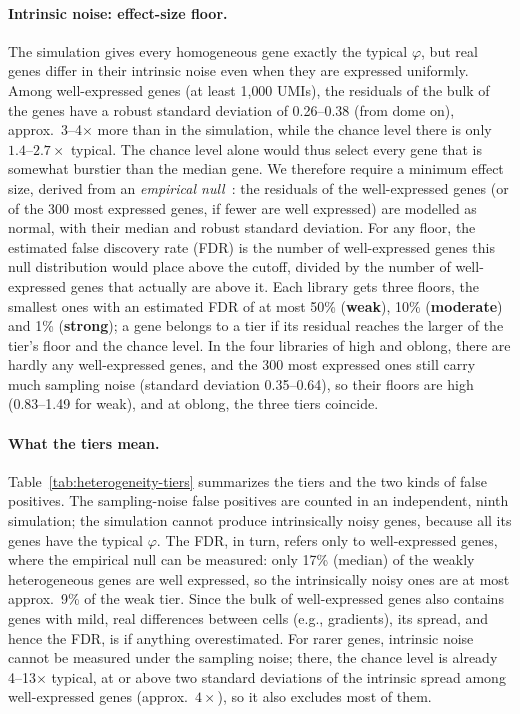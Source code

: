 \documentclass[11pt,a4paper]{article}
\begin{document}
\paragraph{Intrinsic noise: effect-size floor.} The simulation gives every homogeneous gene exactly the typical $\varphi$, but real genes differ in their intrinsic noise even when they are expressed uniformly. Among well-expressed genes (at least 1{,}000 UMIs), the residuals of the bulk of the genes have a robust standard deviation of 0.26--0.38 (from dome on), approx.~3--4$\times$ more than in the simulation, while the chance level there is only $1.4$--$2.7\times$ typical. The chance level alone would thus select every gene that is somewhat burstier than the median gene. We therefore require a minimum effect size, derived from an \emph{empirical null}~\cite{efron2004large}: the residuals of the well-expressed genes (or of the 300 most expressed genes, if fewer are well expressed) are modelled as normal, with their median and robust standard deviation. For any floor, the estimated false discovery rate (FDR) is the number of well-expressed genes this null distribution would place above the cutoff, divided by the number of well-expressed genes that actually are above it. Each library gets three floors, the smallest ones with an estimated FDR of at most 50\% (\textbf{weak}), 10\% (\textbf{moderate}) and 1\% (\textbf{strong}); a gene belongs to a tier if its residual reaches the larger of the tier's floor and the chance level. In the four libraries of high and oblong, there are hardly any well-expressed genes, and the 300 most expressed ones still carry much sampling noise (standard deviation 0.35--0.64), so their floors are high (0.83--1.49 for weak), and at oblong, the three tiers coincide.

\paragraph{What the tiers mean.} Table~\ref{tab:heterogeneity-tiers} summarizes the tiers and the two kinds of false positives. The sampling-noise false positives are counted in an independent, ninth simulation; the simulation cannot produce intrinsically noisy genes, because all its genes have the typical $\varphi$. The FDR, in turn, refers only to well-expressed genes, where the empirical null can be measured: only 17\% (median) of the weakly heterogeneous genes are well expressed, so the intrinsically noisy ones are at most approx.~9\% of the weak tier. Since the bulk of well-expressed genes also contains genes with mild, real differences between cells (e.g., gradients), its spread, and hence the FDR, is if anything overestimated. For rarer genes, intrinsic noise cannot be measured under the sampling noise; there, the chance level is already 4--13$\times$ typical, at or above two standard deviations of the intrinsic spread among well-expressed genes (approx.~$4\times$), so it also excludes most of them.
\end{document}
